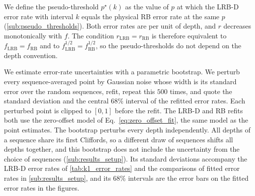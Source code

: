 We define the pseudo-threshold $p^\star(k)$ as the value of $p$ at which the LRB-D error rate with interval $k$ equals the physical RB error rate at the same $p$ (\autoref{sub:pseudo_thresholds}). Both error rates are per unit of depth, and $r$ decreases monotonically with $f$. The condition $r_{\mathrm{LRB}} = r_{\mathrm{RB}}$ is therefore equivalent to $f_{\mathrm{LRB}} = f_{\mathrm{RB}}$ and to $f_{\mathrm{LRB}}^{1/2} = f_{\mathrm{RB}}^{1/2}$, so the pseudo-thresholds do not depend on the depth convention.

We estimate error-rate uncertainties with a parametric bootstrap. We perturb every sequence-averaged point by Gaussian noise whose width is its standard error over the random sequences, refit, repeat this $500$ times, and quote the standard deviation and the central $68\%$ interval of the refitted error rates.
Each perturbed point is clipped to $[0, 1]$ before the refit. The LRB-D and RB refits both use the zero-offset model of Eq.~\eqref{eq:zero_offset_fit}, the same model as the point estimates. The bootstrap perturbs every depth independently. All depths of a sequence share its first Cliffords, so a different draw of sequences shifts all depths together, and this bootstrap does not include the uncertainty from the choice of sequences (\autoref{sub:results_setup}). Its standard deviations accompany the LRB-D error rates of \autoref{tab:k1_error_rates} and the comparisons of fitted error rates in \autoref{sub:results_setup}, and its $68\%$ intervals are the error bars on the fitted error rates in the figures.

